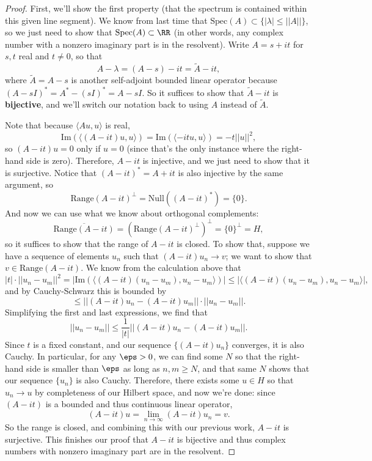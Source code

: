 \begin{proof}
First, we'll show the first property (that the spectrum is contained within this given line segment). We know from last time that $\text{Spec}(A) \subset \{|\lambda| \le ||A||\}$, so we just need to show that $\text{Spec}(A) \subset \RR$ (in other words, any complex number with a nonzero imaginary part is in the resolvent). Write $A = s + it$ for $s, t$ real and $t \ne 0$, so that 
\[
    A - \lambda = (A - s) - it = \tilde{A} - it,
\]
where $\tilde{A} = A-s$ is another self-adjoint bounded linear operator because $(A-sI)^\ast = A^\ast - (sI)^\ast = A - sI$. So it suffices to show that $\tilde{A} - it$ is \textbf{bijective}, and we'll switch our notation back to using $A$ instead of $\tilde{A}$. 

Note that because $\langle Au, u \rangle$ is real, 
\[
    \text{Im}(\langle(A-it)u, u \rangle) = \text{Im}(\langle-itu, u \rangle) = -t ||u||^2,
\]
so $(A - it)u = 0$ only if $u = 0$ (since that's the only instance where the right-hand side is zero). Therefore, $A-it$ is injective, and we just need to show that it is surjective. Notice that $(A - it)^\ast = A+it$ is also injective by the same argument, so 
\[
    \text{Range}(A-it)^\perp = \text{Null}((A-it)^\ast) = \{0\}.
\]
And now we can use what we know about orthogonal complements: 
\[
    \overline{\text{Range}(A-it)} = (\text{Range}(A-it)^\perp)^\perp = \{0\}^\perp = H,
\]
so it suffices to show that the range of $A-it$ is closed. To show that, suppose we have a sequence of elements $u_n$ such that $(A-it)u_n \to v$; we want to show that $v \in \text{Range}(A-it)$. We know from the calculation above that
\[
    |t| \cdot ||u_n - u_m||^2 = |\text{Im}(\langle(A-it)(u_n - u_m), u_n-u_m\rangle)| \le |\langle(A-it)(u_n - u_m), u_n-u_m\rangle|,
\]
and by Cauchy-Schwarz this is bounded by
\[
    \le ||(A-it)u_n - (A-it)u_m|| \cdot ||u_n-u_m||.
\]
Simplifying the first and last expressions, we find that
\[
    ||u_n - u_m|| \le \frac{1}{|t|}||(A-it)u_n - (A-it)u_m||.
\]
Since $t$ is a fixed constant, and our sequence $\{(A-it)u_n\}$ converges, it is also Cauchy. In particular, for any $\eps > 0$, we can find some $N$ so that the right-hand side is smaller than $\eps$ as long as $n, m \ge N$, and that same $N$ shows that our sequence $\{u_n\}$ is also Cauchy. Therefore, there exists some $u \in H$ so that $u_n \to u$ by completeness of our Hilbert space, and now we're done: since $(A-it)$ is a bounded and thus continuous linear operator, 
\[
    (A-it)u = \lim_{n \to \infty} (A-it)u_n = v.
\]
So the range is closed, and combining this with our previous work, $A-it$ is surjective. This finishes our proof that $A-it$ is bijective and thus complex numbers with nonzero imaginary part are in the resolvent.


\end{proof}
